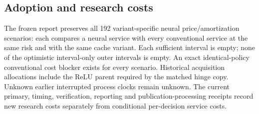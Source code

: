 \subsection{Adoption and research costs}
The frozen report preserves all 192 variant-specific neural price/amortization scenarios: each compares a neural service with every conventional service at the same risk and with the same cache variant. Each sufficient interval is empty; none of the optimistic interval-only outer intervals is empty. An exact identical-policy conventional cost blocker exists for every scenario. Historical acquisition allocations include the ReLU parent required by the matched hinge copy. Unknown earlier interrupted process clocks remain unknown. The current primary, timing, verification, reporting and publication-processing receipts record new research costs separately from conditional per-decision service costs.
